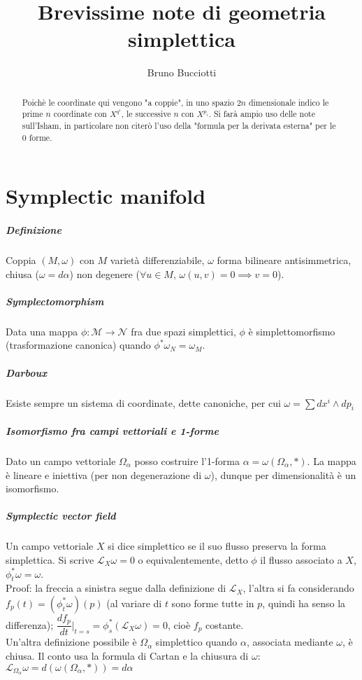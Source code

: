 \documentclass[]{article}
\title{Brevissime note di geometria simplettica}
\author{Bruno Bucciotti}
\newcommand{\w}{\omega}
\begin{document}
	
\maketitle
	
\begin{abstract}
	Poichè le coordinate qui vengono "a coppie", in uno spazio $2n$ dimensionale indico le prime $n$ coordinate con $X^{q^i}$, le successive $n$ con $X^{p_i}$. Si farà ampio uso delle note sull'Isham, in particolare non citerò l'uso della "formula per la derivata esterna" per le 0 forme.
\end{abstract}
	
\section{Symplectic manifold}
\subparagraph{Definizione}
Coppia $(M, \w)$ con $M$ varietà differenziabile, $\w$ forma bilineare antisimmetrica, chiusa ($\w = d\alpha$) non degenere ($\forall u\in M,\, \w(u, v) = 0 \implies v=0$).

\subparagraph{Symplectomorphism}
Data una mappa $\phi: \mathcal{M} \rightarrow \mathcal{N}$ fra due spazi simplettici, $\phi$ è simplettomorfismo (trasformazione canonica) quando $\phi^*\w_N = \w_M$.

\subparagraph{Darboux}
Esiste sempre un sistema di coordinate, dette canoniche, per cui $\w = \sum dx^i \wedge dp_i$

\subparagraph{Isomorfismo fra campi vettoriali e 1-forme}
Dato un campo vettoriale $\Omega_\alpha$ posso costruire l'1-forma $\alpha = \w(\Omega_\alpha, *)$. La mappa è lineare e iniettiva (per non degenerazione di $\w$), dunque per dimensionalità è un isomorfismo.

\subparagraph{Symplectic vector field}
Un campo vettoriale $X$ si dice simplettico se il suo flusso preserva la forma simplettica. Si scrive $\mathcal{L}_X \w = 0$ o equivalentemente, detto $\phi$ il flusso associato a $X$, $\phi_t^* \w = \w$.\\
Proof: la freccia a sinistra segue dalla definizione di $\mathcal{L}_X$, l'altra si fa considerando $f_p(t) = (\phi_t^* \w)(p)$ (al variare di $t$ sono forme tutte in $p$, quindi ha senso la differenza); $\dfrac{df_p}{dt} |_{t=s} = \phi_s^* (\mathcal{L}_X \w) = 0$, cioè $f_p$ costante.\\
Un'altra definizione possibile è $\Omega_\alpha$ simplettico quando $\alpha$, associata mediante $\w$, è chiusa. Il conto usa la formula di Cartan e la chiusura di $\w$: $\mathcal{L}_{\Omega_\alpha} \w = d (\w(\Omega_\alpha, *) ) = d\alpha$
\end{document}
